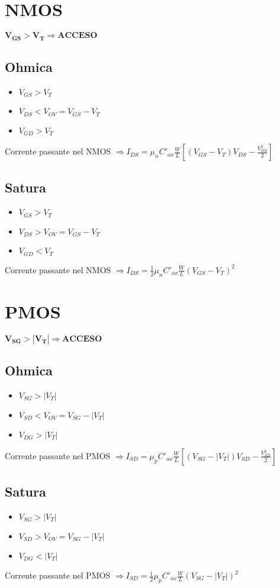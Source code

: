 \documentclass[12pt, letterpaper]{article}
\begin{document}
\section{NMOS}
$\mathbf{V_{GS} > V_T \Rightarrow ACCESO}$

\subsection{Ohmica}
\begin{itemize}
    \item $V_{GS} > V_T$
    \item $V_{DS} < V_{OV} = V_{GS} - V_T$
    \item $V_{GD} > V_T$
\end{itemize}

Corrente passante nel NMOS $\Rightarrow I_{DS} = \mu_nC'_{ox}\frac{W}{L}\left[\left(V_{GS}-V_T\right)V_{DS}-\frac{V_{DS}^2}{2}\right]$

\subsection{Satura}
\begin{itemize}
    \item $V_{GS} > V_T$
    \item $V_{DS} > V_{OV} = V_{GS} - V_T$
    \item $V_{GD} < V_T$
\end{itemize}

Corrente passante nel NMOS $\Rightarrow I_{DS}=\frac{1}{2}\mu_nC'_{ox}\frac{W}{L}\left(V_{GS}-V_T\right)^2$

\newpage
\section{PMOS}
$\mathbf{V_{SG} > \left|V_T\right| \Rightarrow ACCESO}$

\subsection{Ohmica}
\begin{itemize}
    \item $V_{SG} > |V_T|$
    \item $V_{SD} < V_{OV} = V_{SG} - |V_T|$
    \item $V_{DG} > |V_T|$
\end{itemize}

Corrente passante nel PMOS $\Rightarrow I_{SD} = \mu_pC'_{ox}\frac{W}{L}\left[\left(V_{SG}-|V_T|\right)V_{SD}-\frac{V_{SD}^2}{2}\right]$

\subsection{Satura}
\begin{itemize}
    \item $V_{SG} > |V_T|$
    \item $V_{SD} > V_{OV} = V_{SG} - |V_T|$
    \item $V_{DG} < |V_T|$
\end{itemize}

Corrente passante nel PMOS $\Rightarrow I_{SD}=\frac{1}{2}\mu_pC'_{ox}\frac{W}{L}\left(V_{SG}-|V_T|\right)^2$
\end{document}
